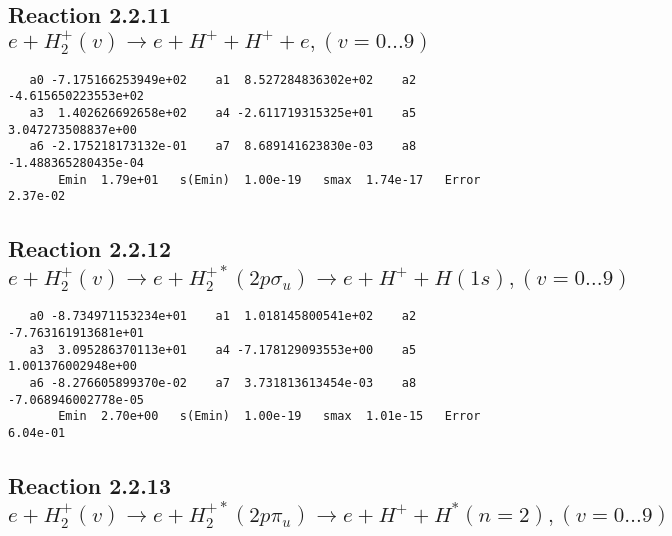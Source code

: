 \documentclass[12pt]{article}
\begin{document}
\newpage
\subsection{
Reaction 2.2.11 $e + H_2^+(v) \rightarrow e + H^+ + H^+ + e, (v=0\ldots 9)$}














\begin{small}\begin{verbatim}
   a0 -7.175166253949e+02    a1  8.527284836302e+02    a2 -4.615650223553e+02
   a3  1.402626692658e+02    a4 -2.611719315325e+01    a5  3.047273508837e+00
   a6 -2.175218173132e-01    a7  8.689141623830e-03    a8 -1.488365280435e-04
       Emin  1.79e+01   s(Emin)  1.00e-19   smax  1.74e-17   Error  2.37e-02
\end{verbatim}\end{small}




\newpage
\subsection{
Reaction 2.2.12 $e + H_2^+(v) \rightarrow e + H_2^{+*}(2p\sigma_u) \rightarrow e + H^+ + H(1s), (v=0\ldots 9)$}














\begin{small}\begin{verbatim}
   a0 -8.734971153234e+01    a1  1.018145800541e+02    a2 -7.763161913681e+01
   a3  3.095286370113e+01    a4 -7.178129093553e+00    a5  1.001376002948e+00
   a6 -8.276605899370e-02    a7  3.731813613454e-03    a8 -7.068946002778e-05
       Emin  2.70e+00   s(Emin)  1.00e-19   smax  1.01e-15   Error  6.04e-01
\end{verbatim}\end{small}




\newpage
\subsection{
Reaction 2.2.13 $ e + H_2^+(v) \rightarrow e + H_2^{+*} (2p\pi_u) \rightarrow e + H^+ + H^*(n=2),  (v=0\ldots 9)$}
\end{document}
